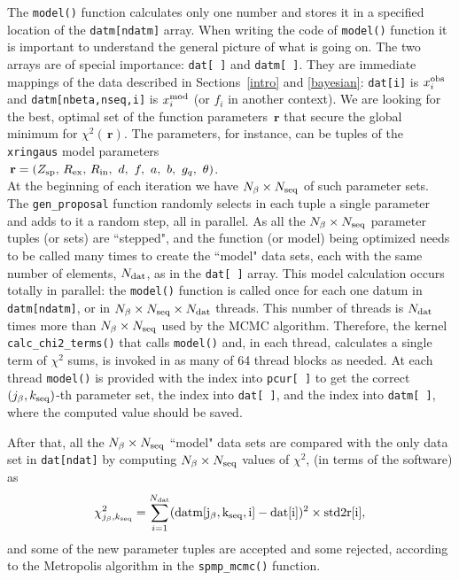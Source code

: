 \documentclass[preprint2]{aastex}
\newcommand{\bfr}{\,\mathbf{r}}
\newcommand{\rex}{\, R_\mathrm{ex}}
\newcommand{\rin}{\, R_\mathrm{in}}
\begin{document}
The \verb|model()| function calculates only one 
number and stores it in a specified location of the \verb|datm[ndatm]| array. 
When writing the code of \verb|model()| function it is important to understand
the general picture of what is going on. The two arrays are of special importance: 
\verb|dat[ ]| and \verb|datm[ ]|. They are immediate mappings of the data 
described in Sections~\ref{intro} and \ref{bayesian}: \verb|dat[i]| is $x_i^{\rm obs}$ and 
\verb|datm[nbeta,nseq,i]| is $x_i^{\rm mod}$ (or $f_i$ in another context).
We are looking for the best, optimal set of the function parameters $\bfr$ that secure 
the global minimum for $\chi^2(\bfr)$.
The parameters, for instance, can be tuples of the \verb|xringaus| model parameters \\
$\bfr = (Z_{\rm sp}, \rex, \rin, \ d, \ f, \ a, \ b, \ g_q, \ \theta)$. \\  
At the beginning of each iteration we have $N_\beta \times N_{\rm seq}$ of such 
parameter sets. The \verb|gen_proposal| function randomly selects in each tuple
a single parameter and adds to it a random step, all in parallel. As all 
the $N_\beta \times N_{\rm seq}$ parameter tuples (or sets) are ``stepped", and 
the function (or model) being optimized needs to be called many times to create the
``model" data sets, each with the same number of elements, $N_{\rm dat}$, as 
in the \verb|dat[ ]| array. This model calculation occurs totally in parallel:
the \verb|model()| function is called once for each one datum in \verb|datm[ndatm]|,
or in $N_\beta \times N_{\rm seq} \times N_{\rm dat}$ threads. This number of
threads is $N_{\rm dat}$ times more than $N_\beta \times N_{\rm seq} $ used by 
the MCMC algorithm. Therefore, the kernel \verb|calc_chi2_terms()| that calls 
\verb|model()| and, in each thread, calculates a single term of $\chi^2$ sums,
is invoked in as many of 64 thread blocks as needed. At each thread
\verb|model()| is provided with the index into \verb|pcur[ ]| to get the correct
$(j_\beta,k_{\rm seq})$-th 
parameter set, the index into \verb|dat[ ]|, and the index into \verb|datm[ ]|, 
where the computed value should be saved.

After that, all the $N_\beta \times N_{\rm seq}$ ``model" data sets are
compared with the only data set in \verb|dat[ndat]| by computing 
$N_\beta \times N_{\rm seq}$ values of $\chi^2$, (in terms of the software) as 
\begin{equation} \label{chi2_soft}
  \chi^2_{j_\beta,k_{\rm seq}} = \sum_{i=1}^{N_{\rm dat}} 
     ({\rm datm[j_\beta,k_{\rm seq},i]} - {\rm dat[i]})^2 \times {\rm std2r[i]},
\end{equation}
and some of the new parameter tuples are accepted and some rejected, according 
to the Metropolis algorithm in the \verb|spmp_mcmc()| function. 
\end{document}
